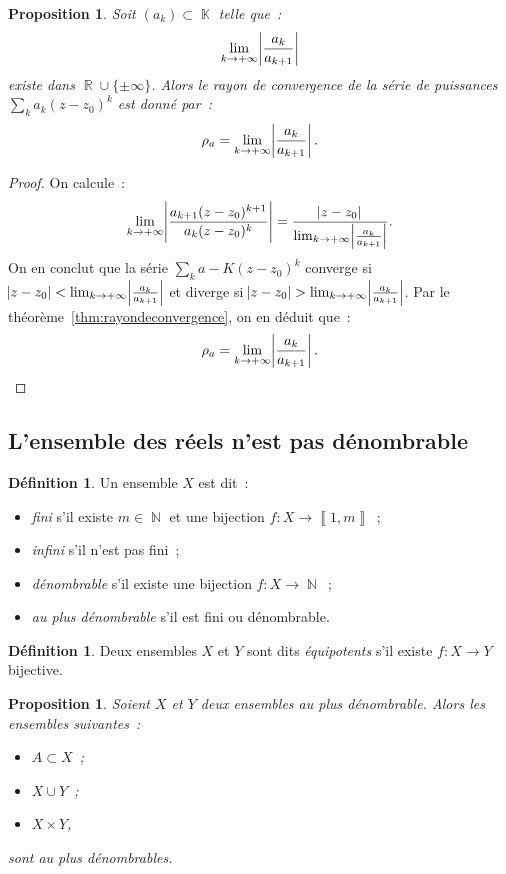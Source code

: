 \documentclass{article}
\DeclareMathOperator{\K}{\mathbb K}
\DeclareMathOperator{\N}{\mathbb N}
\DeclareMathOperator{\R}{\mathbb R}
\newcommand{\intint}[2]{\left\llbracket#1, #2\right\rrbracket}  %
\newtheorem{prp}[thm]{Proposition}
\theoremstyle{definition}
\newtheorem{déf}[thm]{Définition}
\theoremstyle{remark}
\begin{document}
		\begin{prp} Soit $(a_k) \subset \K$ telle que~:
		\[\lim_{k \to +\infty}\abs {\frac {a_k}{a_{k+1}}}\]
		existe dans $\R \cup \{\pm \infty\}$. Alors le rayon de convergence de la série de puissances $\sum_k a_k(z-z_0)^k$ est donné par~:
		\[\rho_a = \lim_{k \to +\infty}\abs {\frac {a_k}{a_{k+1}}}.\]
		\end{prp}

		\begin{proof} On calcule~:
		\[\lim_{k \to +\infty}\abs {\frac {a_{k+1}(z-z_0)^{k+1}}{a_k(z-z_0)^k}} = \frac {\abs{z-z_0}}{\lim_{k \to +\infty}\abs {\frac {a_k}{a_{k+1}}}}.\]
		On en conclut que la série $\sum_k a-K(z-z_0)^k$ converge si $\abs {z-z_0} < \lim_{k \to +\infty}\abs{\frac {a_k}{a_{k+1}}}$ et diverge si
		$\abs {z-z_0} > \lim_{k \to +\infty}\abs{\frac {a_k}{a_{k+1}}}$. Par le théorème~\ref{thm:rayondeconvergence}, on en déduit que~:
		\[\rho_a = \lim_{k \to +\infty}\abs{\frac {a_k}{a_{k+1}}}.\]
		\end{proof}

	\subsection{L'ensemble des réels n'est pas dénombrable}
		\begin{déf} Un ensemble $X$ est dit~:
		\begin{itemize}
			\item \emph{fini} s'il existe $m \in \N$ et une bijection $f : X \to \intint 1m$~;
			\item \emph{infini} s'il n'est pas fini~;
			\item \emph{dénombrable} s'il existe une bijection $f : X \to \N$~;
			\item \emph{au plus dénombrable} s'il est fini ou dénombrable.
		\end{itemize}
		\end{déf}

		\begin{déf} Deux ensembles $X$ et $Y$ sont dits \emph{équipotents} s'il existe $f : X \to Y$ bijective.
		\end{déf}

		\begin{prp}\label{prp:propriétésensdénombrables} Soient $X$ et $Y$ deux ensembles au plus dénombrable. Alors les ensembles suivantes~:
		\begin{itemize}
			\item $A \subset X$~;
			\item $X \cup Y$~;
			\item $X \times Y$,
		\end{itemize}
		sont au plus dénombrables.
		\end{prp}
\end{document}
